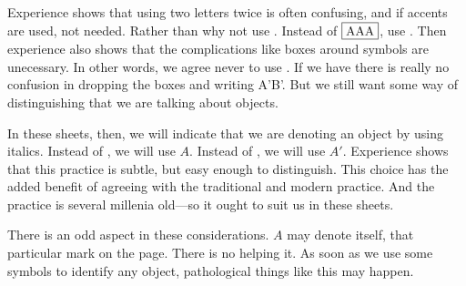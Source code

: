 Experience shows that using two letters twice is often confusing, and if accents are used, not needed.
Rather than  why not use .
Instead of $\fbox{AAA}$, use .
Then experience also shows that the complications like boxes around symbols are unecessary.
In other words, we agree never to use .
If we have  there is really no confusion in dropping the boxes and writing A'B'.
But we still want some way of distinguishing that we are talking about objects.

In these sheets, then, we will indicate that we are denoting an object by using italics.
Instead of , we will use $A$.
Instead of , we will use $A'$.
Experience shows that this practice is subtle, but easy enough to distinguish.
This choice has the added benefit of agreeing with the traditional and modern practice.
And the practice is several millenia old---so it ought to suit us in these sheets.


There is an odd aspect in these considerations.
$A$ may denote itself, that particular mark on the page.
There is no helping it.
As soon as we use some symbols to identify any object, pathological things like this may happen.

